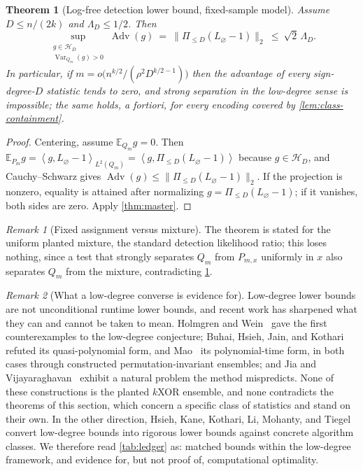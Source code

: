 \documentclass[11pt]{article}
\newtheorem{theorem}{Theorem}[section]
\theoremstyle{definition}
\theoremstyle{remark}
\newtheorem{remark}[remark]{Remark}
\newcommand{\E}{\mathbb E}
\newcommand{\1}{\mathbf 1}
\newcommand{\cH}{\mathcal H}
\newcommand{\ip}[2]{\left\langle #1,#2\right\rangle}
\DeclareMathOperator{\Var}{Var}
\DeclareMathOperator{\Adv}{Adv}
\numberwithin{equation}{section}
\begin{document}
\begin{theorem}[Log-free detection lower bound, fixed-sample model]
\label{thm:ld-detection}
Assume $D\le n/(2k)$ and $\Lambda_D\le1/2$.  Then
\begin{equation}\label{eq:ld-detection}
 \sup_{\substack{g\in\cH_D\\\Var_{Q_m}(g)>0}}\Adv(g)
 \ =\ \bigl\|\Pi_{\le D}(L_\varnothing-1)\bigr\|_2
 \ \le\ \sqrt2\,\Lambda_D .
\end{equation}
In particular, if $m=o\bigl(n^{k/2}/(\rho^2D^{k/2-1})\bigr)$ then the
advantage of every sign-degree-$D$ statistic tends to zero, and strong
separation in the low-degree sense is impossible; the same holds, a
fortiori, for every encoding covered by \cref{lem:class-containment}.
\end{theorem}
\begin{proof}
Centering, assume $\E_{Q_m}g=0$.  Then
$\E_{P_m}g=\ip g{L_\varnothing-1}_{L^2(Q_m)}
=\ip g{\Pi_{\le D}(L_\varnothing-1)}$ because $g\in\cH_D$, and
Cauchy--Schwarz gives
$\Adv(g)\le\|\Pi_{\le D}(L_\varnothing-1)\|_2$.  If the
projection is nonzero, equality is attained after normalizing
$g=\Pi_{\le D}(L_\varnothing-1)$; if it vanishes, both sides are zero.
Apply \cref{thm:master}.
\end{proof}

\begin{remark}[Fixed assignment versus mixture]\label{rem:mixture}
The theorem is stated for the uniform planted mixture, the standard
detection likelihood ratio; this loses nothing, since a test that
strongly separates $Q_m$ from $P_{m,x}$ uniformly in $x$ also separates
$Q_m$ from the mixture, contradicting \cref{thm:ld-detection}.
\end{remark}

\begin{remark}[What a low-degree converse is evidence for]
\label{rem:ld-status}
Low-degree lower bounds are not unconditional runtime lower bounds, and
recent work has sharpened what they can and cannot be taken to mean.
Holmgren and Wein~\cite{HolmgrenWein} gave the first counterexamples to
the low-degree conjecture; Buhai, Hsieh, Jain, and Kothari~\cite{BHJK}
refuted its quasi-polynomial form, and Mao~\cite{MaoLD} its
polynomial-time form, in both cases through constructed
permutation-invariant ensembles; and Jia and
Vijayaraghavan~\cite{JiaVijay} exhibit a natural problem the method
mispredicts.  None of these constructions is the planted $k$XOR
ensemble, and none contradicts the theorems of this section, which
concern a specific class of statistics and stand on their own.  In the
other direction, Hsieh, Kane, Kothari, Li, Mohanty, and
Tiegel~\cite{HKKLMT} convert low-degree bounds into rigorous lower
bounds against concrete algorithm classes.  We therefore read
\cref{tab:ledger} as: matched bounds within the low-degree framework,
and evidence for, but not proof of, computational optimality.
\end{remark}
\end{document}
